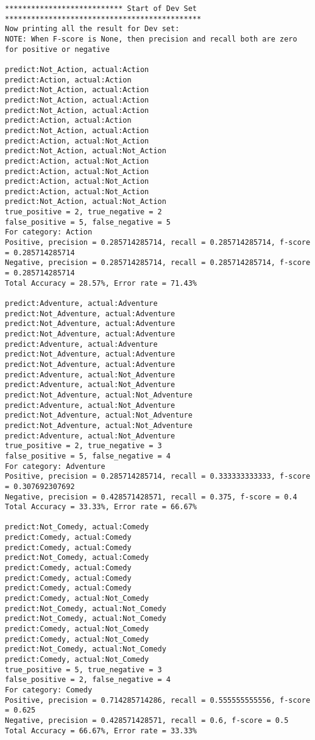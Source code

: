\documentclass{article}
\begin{document}
\begin{lstlisting}
*************************** Start of Dev Set *********************************************
Now printing all the result for Dev set:
NOTE: When F-score is None, then precision and recall both are zero for positive or negative

predict:Not_Action, actual:Action
predict:Action, actual:Action
predict:Not_Action, actual:Action
predict:Not_Action, actual:Action
predict:Not_Action, actual:Action
predict:Action, actual:Action
predict:Not_Action, actual:Action
predict:Action, actual:Not_Action
predict:Not_Action, actual:Not_Action
predict:Action, actual:Not_Action
predict:Action, actual:Not_Action
predict:Action, actual:Not_Action
predict:Action, actual:Not_Action
predict:Not_Action, actual:Not_Action
true_positive = 2, true_negative = 2
false_positive = 5, false_negative = 5
For category: Action
Positive, precision = 0.285714285714, recall = 0.285714285714, f-score = 0.285714285714 
Negative, precision = 0.285714285714, recall = 0.285714285714, f-score = 0.285714285714 
Total Accuracy = 28.57%, Error rate = 71.43%

predict:Adventure, actual:Adventure
predict:Not_Adventure, actual:Adventure
predict:Not_Adventure, actual:Adventure
predict:Not_Adventure, actual:Adventure
predict:Adventure, actual:Adventure
predict:Not_Adventure, actual:Adventure
predict:Not_Adventure, actual:Adventure
predict:Adventure, actual:Not_Adventure
predict:Adventure, actual:Not_Adventure
predict:Not_Adventure, actual:Not_Adventure
predict:Adventure, actual:Not_Adventure
predict:Not_Adventure, actual:Not_Adventure
predict:Not_Adventure, actual:Not_Adventure
predict:Adventure, actual:Not_Adventure
true_positive = 2, true_negative = 3
false_positive = 5, false_negative = 4
For category: Adventure
Positive, precision = 0.285714285714, recall = 0.333333333333, f-score = 0.307692307692 
Negative, precision = 0.428571428571, recall = 0.375, f-score = 0.4 
Total Accuracy = 33.33%, Error rate = 66.67%

predict:Not_Comedy, actual:Comedy
predict:Comedy, actual:Comedy
predict:Comedy, actual:Comedy
predict:Not_Comedy, actual:Comedy
predict:Comedy, actual:Comedy
predict:Comedy, actual:Comedy
predict:Comedy, actual:Comedy
predict:Comedy, actual:Not_Comedy
predict:Not_Comedy, actual:Not_Comedy
predict:Not_Comedy, actual:Not_Comedy
predict:Comedy, actual:Not_Comedy
predict:Comedy, actual:Not_Comedy
predict:Not_Comedy, actual:Not_Comedy
predict:Comedy, actual:Not_Comedy
true_positive = 5, true_negative = 3
false_positive = 2, false_negative = 4
For category: Comedy
Positive, precision = 0.714285714286, recall = 0.555555555556, f-score = 0.625 
Negative, precision = 0.428571428571, recall = 0.6, f-score = 0.5 
Total Accuracy = 66.67%, Error rate = 33.33%


\end{lstlisting}
\end{document}
